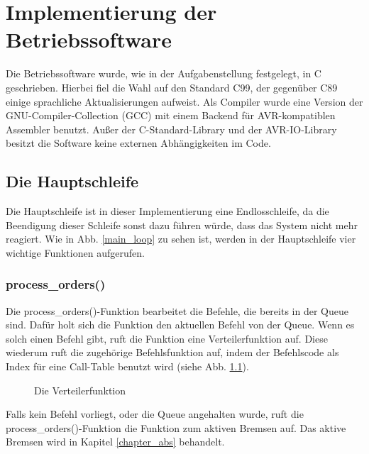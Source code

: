 \chapter{Implementierung der Betriebssoftware}
Die Betriebssoftware wurde, wie in der Aufgabenstellung festgelegt, in C geschrieben.
Hierbei fiel die Wahl auf den Standard C99, der gegenüber C89 einige sprachliche
Aktualisierungen aufweist. Als Compiler wurde eine Version der
GNU-Compiler-Collection (GCC) mit einem Backend für AVR-kompatiblen Assembler benutzt.
Außer der C-Standard-Library und der AVR-IO-Library besitzt die Software keine externen
Abhängigkeiten im Code.

\section{Die Hauptschleife}
Die Hauptschleife ist in dieser Implementierung eine Endlosschleife, da die Beendigung dieser
Schleife sonst dazu führen würde, dass das System nicht mehr reagiert.
Wie in Abb. \ref{main_loop} zu sehen ist, werden in der Hauptschleife vier wichtige Funktionen
aufgerufen.

\subsection{process\_orders()}
Die process\_\-orders()\--Funktion bearbeitet die Befehle, die bereits in der Queue sind. Dafür holt
sich die Funktion den aktuellen Befehl von der Queue. Wenn es solch einen Befehl gibt, ruft die
Funktion eine Verteilerfunktion auf. Diese wiederum ruft die zugehörige Befehlsfunktion auf, indem
der Befehlscode als Index für eine Call-Table benutzt wird (siehe
Abb. \ref{dispatch_function}).\\
\begin{figure}[htb]
 \centering
 \caption{\label{dispatch_function}Die Verteilerfunktion}
\end{figure}
Falls kein Befehl vorliegt, oder die Queue angehalten wurde, ruft die process\_\-orders()-Funktion die
Funktion zum aktiven Bremsen auf. Das aktive Bremsen wird in Kapitel \ref{chapter_abs} behandelt.

